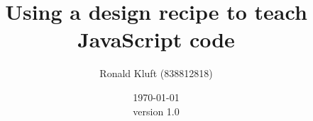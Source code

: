 \documentclass{article}
\begin{document}
 

\title{Using a design recipe to teach JavaScript code}
\author{Ronald Kluft (838812818)} 
\date{\today \\version 1.0} \maketitle 





\printglossaries
\end{document}

